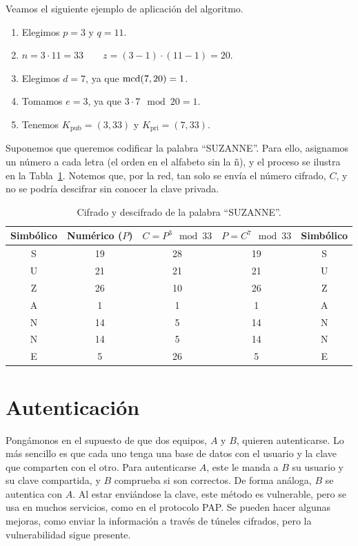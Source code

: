 \begin{ejemplo}
    Veamos el siguiente ejemplo de aplicación del algoritmo.
    \begin{enumerate}
        \item Elegimos $p=3$ y $q=11$.
        \item $n = 3\cdot 11 = 33\qquad z = (3-1)\cdot(11-1) = 20$.
        \item Elegimos $d=7$, ya que $\operatorname{mcd}(7,20)=1$.
        \item Tomamos $e=3$, ya que $3\cdot 7 \mod 20 = 1$.
        \item Tenemos $K_{\text{pub}} = (3,33)$ y $K_{\text{pri}} = (7,33)$.
    \end{enumerate}

    Suponemos que queremos codificar la palabra ``SUZANNE''. Para ello, asignamos un número a cada letra (el orden en el alfabeto sin la ñ), y el proceso se ilustra en la Tabla~\ref{tab:rsa}. Notemos que, por la red, tan solo se envía el número cifrado, $C$, y no se podría descifrar sin conocer la clave privada.
    \begin{table}[H]
        \centering
        \begin{tabular}{cc||c||cc}
            Simbólico & Numérico ($P$) & $C=P^3\mod 33$ & $P=C^7\mod 33$ & Simbólico\\
            \hline
            S & 19 & 28 & 19 & S\\
            U & 21 & 21 & 21 & U\\
            Z & 26 & 10 & 26 & Z\\
            A & 1 & 1 & 1 & A\\
            N & 14 & 5 & 14 & N\\
            N & 14 & 5 & 14 & N\\
            E & 5 & 26 & 5 & E
        \end{tabular}
        \caption{Cifrado y descifrado de la palabra ``SUZANNE''.}
        \label{tab:rsa}
    \end{table}
\end{ejemplo}

\section{Autenticación}
Pongámonos en el supuesto de que dos equipos, $A$ y $B$, quieren autenticarse. Lo más sencillo es que cada uno tenga una base de datos con el usuario y la clave que comparten con el otro. Para autenticarse $A$, este le manda a $B$ su usuario y su clave compartida, y $B$ comprueba si son correctos. De forma análoga, $B$ se autentica con $A$. Al estar enviándose la clave, este método es vulnerable, pero se usa en muchos servicios, como en el protocolo \acrshort{PAP}. Se pueden hacer algunas mejoras, como enviar la información a través de túneles cifrados, pero la vulnerabilidad sigue presente.\\

